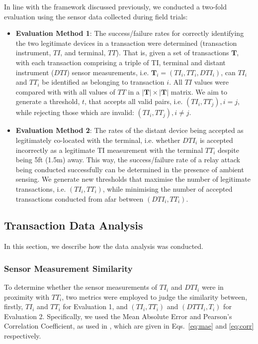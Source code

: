 \documentclass[runningheads,a4paper]{llncs}
\begin{document}
In line with the framework discussed previously, we conducted a two-fold evaluation using the sensor data collected during field trials:
\begin{itemize}
	\item \textbf{Evaluation Method 1}: The success/failure rates for correctly identifying the two legitimate devices in a transaction were determined (transaction instrument, $TI$, and terminal, $TT$).  That is, given a set of transactions $\textbf{T}$, with each transaction comprising a triple of TI, terminal and distant instrument ($DTI$) sensor measurements, i.e. $\textbf{T}_{i} = (TI_{i}, TT_{i}, DTI_{i})$, can $TI_{i}$ and $TT_{i}$ be identified as belonging to transaction $i$.  All $TI$ values were compared with with all values of $TT$ in a $\lvert\textbf{T}\rvert \times \lvert \textbf{T}\rvert$ matrix.  We aim to generate a threshold, $t$, that accepts all valid pairs, i.e. $(TI_{i}, TT_{j}), i=j$, while rejecting those which are invalid: $(TI_{i}, TT_{j}), i \neq j$.
		\\
	\item \textbf{Evaluation Method 2}: The rates of the distant device being accepted as legitimately co-located with the terminal, i.e. whether $DTI_{i}$ is accepted incorrectly as a legitimate TI measurement with the terminal $TT_{i}$ despite being 5ft (1.5m) away.  This way, the success/failure rate of a relay attack being conducted successfully can be determined in the presence of ambient sensing.  We generate new thresholds that maximise the number of legitimate transactions, i.e. $(TI_{i}, TT_{i})$, while minimising the number of accepted transactions conducted from afar between $(DTI_{i}, TT_{i})$.
\end{itemize}

\subsection{Transaction Data Analysis}
\label{sec:sim}

In this section, we describe how the data analysis was conducted. 

\subsubsection{Sensor Measurement Similarity}
To determine whether the sensor measurements of $TI_{i}$ and $DTI_{i}$ were in proximity with $TT_{i}$, two metrics were employed to judge the similarity between, firstly, $TI_{i}$ and $TT_{i}$ for Evaluation 1, and $(TI_{i}, TT_{i})$ and $(DTTI_{i}, T_{i})$ for Evaluation 2.  Specifically, we used the Mean Absolute Error and Pearson's Correlation Coefficient, as used in \cite{mehrnezhad2014tap}, which are given in Eqs.~\ref{eq:mae} and \ref{eq:corr} respectively.
\end{document}

